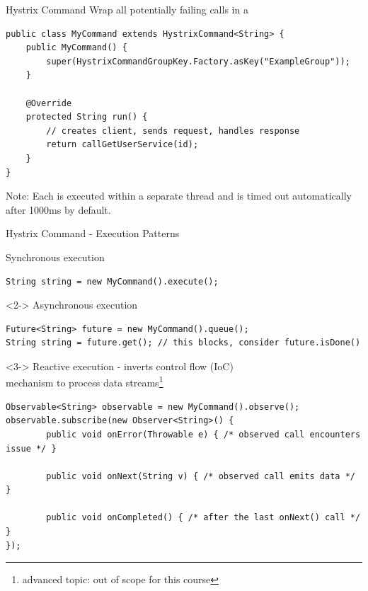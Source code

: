 \begin{frame}[fragile]{Hystrix Command}
Wrap all potentially failing calls in a 
\begin{lstlisting}
public class MyCommand extends HystrixCommand<String> {
    public MyCommand() {
        super(HystrixCommandGroupKey.Factory.asKey("ExampleGroup"));
    }

    @Override
    protected String run() {
        // creates client, sends request, handles response
        return callGetUserService(id);
    }
}
\end{lstlisting}
\vfill
\footnotesize{Note: Each  is executed within a separate thread and is timed out automatically after 1000ms by default.}
\end{frame}


   
\begin{frame}[fragile]{Hystrix Command - Execution Patterns}

Synchronous execution
\begin{lstlisting}
String string = new MyCommand().execute();
\end{lstlisting}

\begin{visibleenv}<2->
Asynchronous execution
\begin{lstlisting}
Future<String> future = new MyCommand().queue();
String string = future.get(); // this blocks, consider future.isDone()
\end{lstlisting}
\end{visibleenv}

\begin{visibleenv}<3->
Reactive execution - inverts control flow (IoC) \\mechanism to process data streams\footnote{advanced topic: out of scope for this course}
\begin{lstlisting}
Observable<String> observable = new MyCommand().observe();
observable.subscribe(new Observer<String>() {
        public void onError(Throwable e) { /* observed call encounters issue */ }

        public void onNext(String v) { /* observed call emits data */ }
        
        public void onCompleted() { /* after the last onNext() call */ }
});
\end{lstlisting}
\end{visibleenv}
\end{frame}

